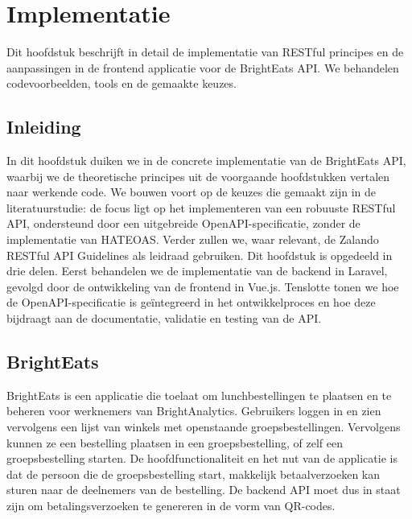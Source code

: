 
\chapter{Implementatie}
\label{ch:implementatie}

Dit hoofdstuk beschrijft in detail de implementatie van RESTful principes en de aanpassingen in de frontend applicatie voor de BrightEats API. We behandelen codevoorbeelden, tools en de gemaakte keuzes.

\section{Inleiding}

In dit hoofdstuk duiken we in de concrete implementatie van de BrightEats API, waarbij we de theoretische principes uit de voorgaande hoofdstukken vertalen naar werkende code. We bouwen voort op de keuzes die gemaakt zijn in de literatuurstudie: de focus ligt op het implementeren van een robuuste RESTful API, ondersteund door een uitgebreide OpenAPI-specificatie, zonder de implementatie van HATEOAS. Verder zullen we, waar relevant, de Zalando RESTful API Guidelines als leidraad gebruiken. Dit hoofdstuk is opgedeeld in drie delen. Eerst behandelen we de implementatie van de backend in Laravel, gevolgd door de ontwikkeling van de frontend in Vue.js. Tenslotte tonen we hoe de OpenAPI-specificatie is geïntegreerd in het ontwikkelproces en hoe deze bijdraagt aan de documentatie, validatie en testing van de API.

\section{BrightEats}

BrightEats is een applicatie die toelaat om lunchbestellingen te plaatsen en te beheren voor werknemers van BrightAnalytics. Gebruikers loggen in en zien vervolgens een lijst van winkels met openstaande groepsbestellingen. Vervolgens kunnen ze een bestelling plaatsen in een groepsbestelling, of zelf een groepsbestelling starten. De hoofdfunctionaliteit en het nut van de applicatie is dat de persoon die de groepsbestelling start, makkelijk betaalverzoeken kan sturen naar de deelnemers van de bestelling. De backend API moet dus in staat zijn om betalingsverzoeken te genereren in de vorm van QR-codes.

